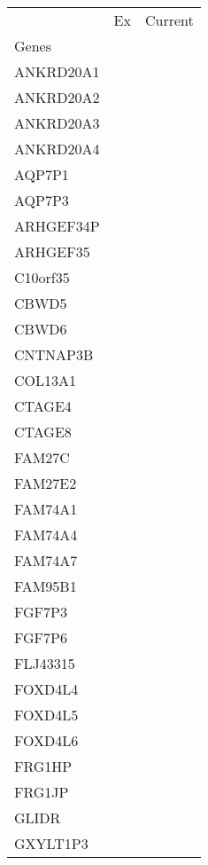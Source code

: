 \begin{tabular}{lcc}
\toprule
{} & Ex & Current \\
Genes              &    &         \\
\midrule
ANKRD20A1          &    &         \\
ANKRD20A2          &    &         \\
ANKRD20A3          &    &         \\
ANKRD20A4          &    &         \\
AQP7P1             &    &         \\
AQP7P3             &    &         \\
ARHGEF34P          &    &         \\
ARHGEF35           &    &         \\
C10orf35           &    &         \\
CBWD5              &    &         \\
CBWD6              &    &         \\
CNTNAP3B           &    &         \\
COL13A1            &    &         \\
CTAGE4             &    &         \\
CTAGE8             &    &         \\
FAM27C             &    &         \\
FAM27E2            &    &         \\
FAM74A1            &    &         \\
FAM74A4            &    &         \\
FAM74A7            &    &         \\
FAM95B1            &    &         \\
FGF7P3             &    &         \\
FGF7P6             &    &         \\
FLJ43315           &    &         \\
FOXD4L4            &    &         \\
FOXD4L5            &    &         \\
FOXD4L6            &    &         \\
FRG1HP             &    &         \\
FRG1JP             &    &         \\
GLIDR              &    &         \\
GXYLT1P3           &    &         \\

\end{tabular}
